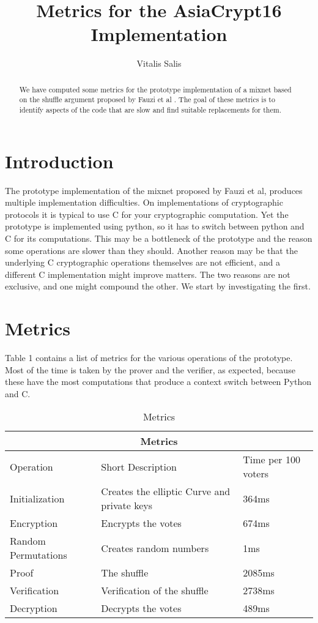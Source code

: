 \documentclass{article}
\date{}
\begin{document}
\title{Metrics for the AsiaCrypt16 Implementation} 

\author{Vitalis Salis}

\maketitle
\begin{abstract}
  We have computed some metrics for the prototype implementation
  \cite{prototype} of a mixnet based on the shuffle argument proposed
  by Fauzi et al \cite{shufflearg}. The goal of these metrics is to
  identify aspects of the code that are slow and find suitable
  replacements for them.
\end{abstract}

\section{Introduction}

The prototype implementation of the mixnet proposed by Fauzi et al,
produces multiple implementation difficulties. On implementations of
cryptographic protocols it is typical to use C for your cryptographic
computation. Yet the prototype is implemented using python, so it has
to switch between python and C for its computations. This may be a
bottleneck of the prototype and the reason some operations are slower
than they should. Another reason may be that the underlying C
cryptographic operations themselves are not efficient, and a different
C implementation might improve matters. The two reasons are not
exclusive, and one might compound the other. We start by investigating
the first. 

\section{Metrics}

Table 1 contains a list of metrics for the various operations of the
prototype. Most of the time is taken by the prover and the verifier,
as expected, because these have the most computations that produce a
context switch between Python and C.

\begin{table}
\begin{tabular}{ |p{3cm}|p{5cm}|p{3cm}|  }
    \hline
    \multicolumn{3}{|c|}{Metrics}\\
    \hline
    Operation & Short Description & Time per 100 voters\\
    \hline
    Initialization & Creates the elliptic Curve and private keys & 364ms\\
    Encryption & Encrypts the votes & 674ms\\
    Random Permutations & Creates random numbers & 1ms\\
    Proof & The shuffle & 2085ms\\
    Verification & Verification of the shuffle & 2738ms\\
    Decryption & Decrypts the votes & 489ms\\
    \hline
\end{tabular}
\caption{Metrics}
\end{table}
\end{document}
